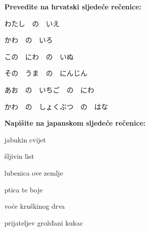 
\author{Tomislav Mamić, Željka Ludošan}


	
	\normalsize \textbf{Prevedite na hrvatski sljedeće rečenice:}	
	
	\begin{mondai}{}
		\item わたし　の　いえ
		\item かわ　の　いろ

		\item この　にわ　の　いぬ
		\item その　うま　の　にんじん

		\item あお　の　いちご　の　にわ
		\item かわ　の　しょくぶつ　の　はな
	\end{mondai}
	
	\normalsize \textbf{Napišite na japanskom sljedeće rečenice:}	
	
	\begin{mondai}{}
		\item jabukin cvijet
		\item šljivin list

		\item lubenica ove zemlje
		\item ptica te boje

		\item voće kruškinog drva
		\item prijateljev grožđani kukac 
	\end{mondai}



